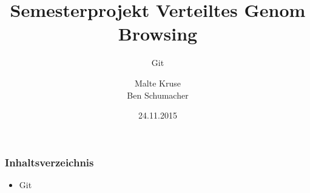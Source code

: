 \documentclass{beamer}
\title[VGB]{Semesterprojekt Verteiltes Genom Browsing}
\subtitle{Git}
\author[Kruse,Schumacher]{Malte Kruse\\Ben Schumacher}
\institute{Institut für Informatik\\Humboldt-Universität zu Berlin}
\date{24.11.2015}
\begin{document}
\begin{frame}
	\titlepage
\end{frame}


\begin{frame}
	\frametitle{Inhaltsverzeichnis}
	\begin{itemize}
		\item Git
	\end{itemize}
\end{frame}
\end{document}
